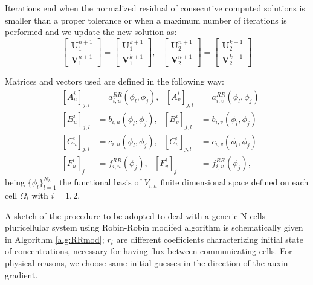 Iterations end when the normalized residual of consecutive computed solutions is smaller than a proper tolerance or when a maximum number of iterations is performed and we update the new solution as:
 $$\begin{bmatrix} \mathbf{U}_1^{n+1} \\ \mathbf{V}_1^{n+1} \end{bmatrix} = \begin{bmatrix} \mathbf{U}_1^{k+1} \\ \mathbf{V}_1^{k+1} \end{bmatrix}, \ \ \ \begin{bmatrix} \mathbf{U}_2^{n+1} \\ \mathbf{V}_2^{n+1} \end{bmatrix} = \begin{bmatrix} \mathbf{U}_2^{k+1} \\ \mathbf{V}_2^{k+1} \end{bmatrix}$$

Matrices and vectors used are defined in the following way:
\begin{equation}
    \begin{aligned}
    & \left[ A_u^i\right]_{j,l} & = a_{i,u}^{RR}(\phi_l, \phi_j), \ \ \ \left[ A_v^i\right]_{j,l} & = a_{i,v}^{RR}(\phi_l, \phi_j) \\
    & \left[ B_u^i\right]_{j,l} & = b_{i,u}(\phi_l, \phi_j), \ \ \ \left[ B_v^i\right]_{j,l} & = b_{i,v}(\phi_l, \phi_j)\\
    & \left[ C_u^i\right]_{j,l} & = c_{i,u}(\phi_l, \phi_j),\ \ \ \left[ C_v^i\right]_{j,l} & = c_{i,v}(\phi_l, \phi_j)\\
    & \left[F_u^i\right]_{j} & = f_{i,u}^{RR}(\phi_j), \ \ \
    \left[F_v^i\right]_{j} & = f_{i,v}^{RR}(\phi_j),
    \end{aligned}
\end{equation}
being $\{\phi_l\}_{l = 1}^{N_h}$ the functional basis of $V_{i,h}$ finite dimensional space defined on each cell $\Omega_i$ with $i =1,2$.

A sketch of the procedure to be adopted to deal with a generic N cells pluricellular system using Robin-Robin modifed algorithm is schematically given in Algorithm \ref{alg:RRmod};
$r_i$ are different coefficients characterizing initial state of concentrations, necessary for having flux between communicating cells. For physical reasons, we choose same initial guesses in the direction of the auxin gradient.

